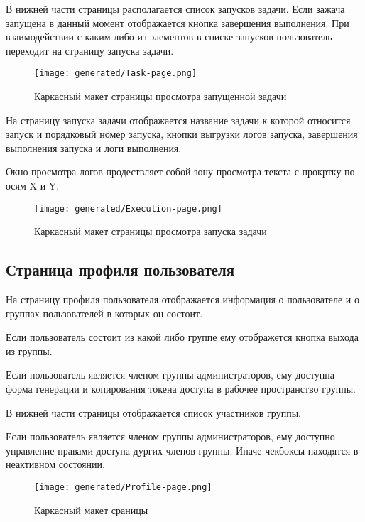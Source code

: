 В нижней части страницы располагается список запусков задачи. Если зажача запущена в данный момент отображается кнопка завершения выполнения. При взаимодействии с каким либо из элементов в списке запусков пользователь переходит на страницу запуска задачи.

\begin{figure*}[!t]
  \centering
  \texttt{[image: generated/Task-page.png]}
  \caption{Каркасный макет страницы просмотра запущенной задачи}
  \label{Task-page}
\end{figure*}

На страницу запуска задачи отображается название задачи к которой относится запуск и порядковый номер запуска, кнопки выгрузки логов запуска, завершения выполнения запуска и логи выполнения. 

Окно просмотра логов продествляет собой зону просмотра текста с прокртку по осям X и Y.

\begin{figure*}[!t]
  \centering
  \texttt{[image: generated/Execution-page.png]}
  \caption{Каркасный макет страницы просмотра запуска задачи}
  \label{Execution-page}
\end{figure*}

\subsection{Страница профиля пользователя}

На страницу профиля пользователя отображается информация о пользователе и о группах пользователей в которых он состоит.

Если пользователь состоит из какой либо группе ему отображется кнопка выхода из группы.

Если пользователь является членом группы администраторов, ему доступна форма генерации и копирования токена доступа в рабочее пространство группы.

В нижней части страницы отображается список участников группы.

Если пользователь является членом группы администраторов, ему доступно управление правами доступа дургих членов группы. Иначе чекбоксы находятся в неактивном состоянии.

\begin{figure*}[!t]
  \centering
  \texttt{[image: generated/Profile-page.png]}
  \caption{Каркасный макет сраницы }
  \label{Profile-page}
\end{figure*}

